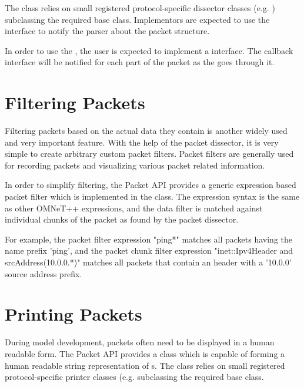 The  class relies on small registered
protocol-specific dissector classes (e.g. )
subclassing the required  base class. Implementors
are expected to use the  interface to
notify the parser about the packet structure.


In order to use the , the user is expected to
implement a   interface. The callback
interface will be notified for each part of the packet as the
 goes through it.


\section{Filtering Packets}

Filtering packets based on the actual data they contain is another widely used
and very important feature. With the help of the packet dissector, it is very
simple to create arbitrary custom packet filters. Packet filters are generally
used for recording packets and visualizing various packet related information.

In order to simplify filtering, the Packet API provides a generic expression
based packet filter which is implemented in the  class.
The expression syntax is the same as other OMNeT++ expressions, and the data
filter is matched against individual chunks of the packet as found by the packet
dissector.

For example, the packet filter expression "ping*" matches all packets having the
name prefix 'ping', and the packet chunk filter expression "inet::Ipv4Header and
srcAddress(10.0.0.*)" matches all packets that contain an  header
with a '10.0.0' source address prefix.


\section{Printing Packets}

During model development, packets often need to be displayed in a human readable
form. The Packet API provides a  class which is capable
of forming a human readable string representation of s. The
 class relies on small registered protocol-specific
printer classes (e.g.  subclassing the required
 base class.

